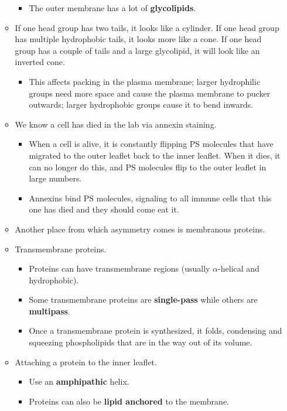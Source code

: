 \documentclass[../notes.tex]{subfiles}
\begin{document}
\begin{itemize}
\begin{itemize}
\begin{itemize}
            \item The outer membrane has a lot of \textbf{glycolipids}.
        \end{itemize}
        \item If one head group has two tails, it looks like a cylinder. If one head group has multiple hydrophobic tails, it looks more like a cone. If one head group has a couple of tails and a large glycolipid, it will look like an inverted cone.
        \begin{itemize}
            \item This affects packing in the plasma membrane; larger hydrophilic groups need more space and cause the plasma membrane to pucker outwards; larger hydrophobic groups cause it to bend inwards.
        \end{itemize}
        \item We know a cell has died in the lab via annexin staining.
        \begin{itemize}
            \item When a cell is alive, it is constantly flipping PS molecules that have migrated to the outer leaflet back to the inner leaflet. When it dies, it can no longer do this, and PS molecules flip to the outer leaflet in large numbers.
            \item Annexins bind PS molecules, signaling to all immune cells that this one has died and they should come eat it.
        \end{itemize}
        \item Another place from which asymmetry comes is membranous proteins.
        \item Transmembrane proteins.
        \begin{itemize}
            \item Proteins can have transmembrane regions (usually $\alpha$-helical and hydrophobic).
            \item Some transmembrane proteins are \textbf{single-pass} while others are \textbf{multipass}.
            \item Once a transmembrane protein is synthesized, it folds, condensing and squeezing phospholipids that are in the way out of its volume.
        \end{itemize}
        \item Attaching a protein to the inner leaflet.
        \begin{itemize}
            \item Use an \textbf{amphipathic} helix.
            \item Proteins can also be \textbf{lipid anchored} to the membrane.

\end{itemize}
\end{itemize}
\end{itemize}
\end{document}
